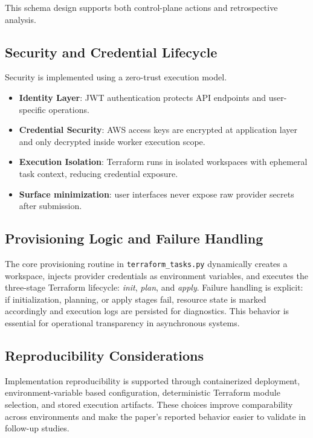 This schema design supports both control-plane actions and retrospective analysis.

\subsection{Security and Credential Lifecycle}
Security is implemented using a zero-trust execution model.
\begin{itemize}
    \item \textbf{Identity Layer}: JWT authentication protects API endpoints and user-specific operations.
    \item \textbf{Credential Security}: AWS access keys are encrypted at application layer and only decrypted inside worker execution scope.
    \item \textbf{Execution Isolation}: Terraform runs in isolated workspaces with ephemeral task context, reducing credential exposure.
    \item \textbf{Surface minimization}: user interfaces never expose raw provider secrets after submission.
\end{itemize}

\subsection{Provisioning Logic and Failure Handling}
The core provisioning routine in \texttt{terraform\_tasks.py} dynamically creates a workspace, injects provider credentials as environment variables, and executes the three-stage Terraform lifecycle: \textit{init}, \textit{plan}, and \textit{apply}. Failure handling is explicit: if initialization, planning, or apply stages fail, resource state is marked accordingly and execution logs are persisted for diagnostics. This behavior is essential for operational transparency in asynchronous systems.

\subsection{Reproducibility Considerations}
Implementation reproducibility is supported through containerized deployment, environment-variable based configuration, deterministic Terraform module selection, and stored execution artifacts. These choices improve comparability across environments and make the paper's reported behavior easier to validate in follow-up studies.
